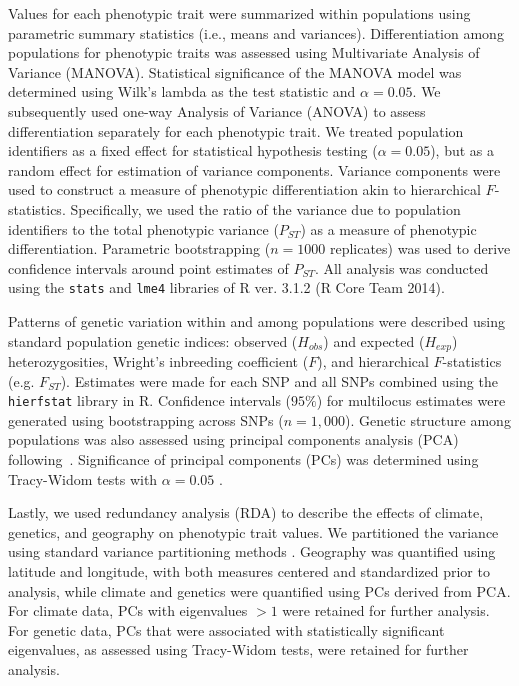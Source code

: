 \documentclass[smallextended]{svjour3}
\begin{document}
Values for each phenotypic trait were summarized  within populations using
parametric summary statistics (i.e., means and variances). Differentiation among
populations for phenotypic traits was assessed using Multivariate Analysis of
Variance (MANOVA). Statistical significance of the MANOVA model was determined
using Wilk's lambda as the test statistic and $\alpha = 0.05$. We subsequently
used one-way Analysis of Variance (ANOVA) to assess differentiation separately
for each phenotypic trait. We treated population identifiers as a fixed effect
for statistical hypothesis testing ($\alpha = 0.05$), but as a random effect for
estimation of variance components. Variance components were used to construct a
measure of phenotypic differentiation akin to hierarchical $F$-statistics.
Specifically, we used the ratio of the variance due to population identifiers to
the total phenotypic variance ($P_{ST}$) as a measure of phenotypic
differentiation. Parametric bootstrapping ($n = 1000$ replicates) was used
to derive confidence intervals around point estimates of $P_{ST}$. All analysis
was conducted using the \texttt{stats} and
\texttt{lme4} libraries of R ver. 3.1.2 (R Core Team 2014).

Patterns of genetic variation within and among populations were described using
standard population genetic indices: observed ($H_{obs}$) and expected
($H_{exp}$) heterozygosities, Wright's inbreeding coefficient ($F$), and
hierarchical $F$-statistics (e.g. $F_{ST}$). Estimates were made for each SNP
and all SNPs combined using the \texttt{hierfstat} library in R. Confidence
intervals ($95\%$) for multilocus estimates were generated using bootstrapping
across SNPs ($n = 1,000$). Genetic structure among populations was also assessed
using principal components analysis (PCA) following~\cite{Patterson:2006}.
Significance of principal components (PCs) was determined using Tracy-Widom
tests with $\alpha = 0.05$ \citep{Patterson:2006}.

Lastly, we used redundancy analysis (RDA) to describe the effects of climate,
genetics, and geography on phenotypic trait values. We partitioned the variance
using standard variance partitioning methods \citep{Borcard:1992, Liu:1997}.
Geography was quantified using latitude and longitude, with both measures
centered and standardized prior to analysis, while climate and genetics were
quantified using PCs derived from PCA. For climate data, PCs with eigenvalues
$> 1$ were retained for further analysis. For genetic data, PCs that were
associated with statistically significant eigenvalues, as assessed using
Tracy-Widom tests, were retained for further analysis.
\end{document}
